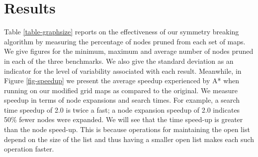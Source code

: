 \section{Results}
\label{sec-results}
Table \ref{table-graphsize} reports on the effectiveness of our
symmetry breaking algorithm by measuring the percentage of nodes
pruned from each set of maps.  We give figures for the minimum,
maximum and average number of nodes pruned in each of the three
benchmarks.  We also give the standard deviation as an indicator
for the level of variability associated with each result.  Meanwhile,
in Figure \ref{fig-speedup} we present the average speedup experienced
by A* when running on our modified grid maps as compared to the
original.  We measure speedup in terms of node expansions and search
times.  For example, a search time speedup of 2.0 is twice a fast;
a node expansion speedup of 2.0 indicates 50\% fewer nodes were
expanded.  We will see that the time speed-up is greater than the
node speed-up.  This is because operations for maintaining the open
list depend on the size of the list and thus having a smaller open
list makes each such operation faster.

